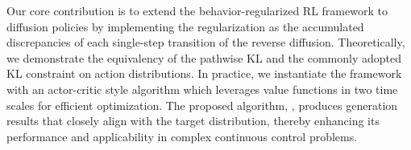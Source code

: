 Our core contribution is to extend the behavior-regularized RL framework to diffusion policies by implementing the regularization as the accumulated discrepancies of each single-step transition of the reverse diffusion. Theoretically, we demonstrate the equivalency of the pathwise KL and the commonly adopted KL constraint on action distributions. In practice, we instantiate the framework with an actor-critic style algorithm which leverages value functions in two time scales for efficient optimization. The proposed algorithm, \algbb, produces generation results that closely align with the target distribution, thereby enhancing its performance and applicability in complex continuous control problems.
